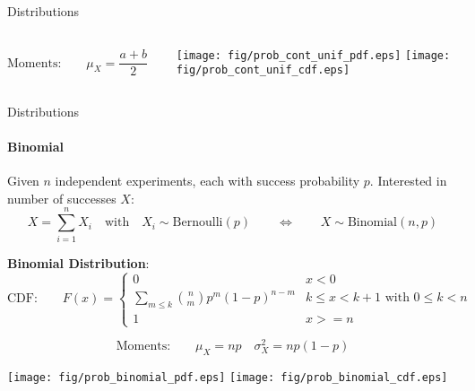 {\begin{frame}{Distributions}
\begin{columns}[onlytextwidth]
\begin{column}{0.5\textwidth}
\begin{boxed}
                    $$\text{Moments:}\qquad \displaystyle \mu_X = \frac{a+b}{2} \quad \sigma_X^2 = \frac{(b-a)^2}{12}$$
                \end{boxed}
            \end{column}
            \begin{column}{0.5\textwidth}
                \begin{center}
                    \texttt{[image: fig/prob\_cont\_unif\_pdf.eps]}
                    \texttt{[image: fig/prob\_cont\_unif\_cdf.eps]}
                \end{center}
            \end{column}
        \end{columns}
    \end{frame}

    \begin{frame}{Distributions}
        \framesubtitle{Binomial}
        Given $n$ independent experiments, each with success probability $p$. Interested in
        number of successes $X$:
        $$X = \sum_{i=1}^n X_i \quad \text{with} \quad X_i \sim \mathrm{Bernoulli}(p)
            \qquad \Longleftrightarrow \qquad X \sim \mathrm{Binomial}(n, p)
        $$

        \vspace*{-2mm}
        \begin{boxed}
            \textbf{Binomial Distribution}:
            $$
                \text{CDF:}\qquad F(x) = \begin{cases}
                    0                                          & x < 0                                   \\
                    \sum_{m \le k} \binom{n}{m} p^m(1-p)^{n-m} & k \le x < k+1 \text{ with } 0 \le k < n \\
                    1                                          & x >= n
                \end{cases}
            $$

            $$\text{Moments:}\qquad \displaystyle \mu_X = np \quad \sigma_X^2 = np(1-p)$$
        \end{boxed}
        \vspace*{-3mm}
        \begin{center}
            \texttt{[image: fig/prob\_binomial\_pdf.eps]}
            \qquad
            \texttt{[image: fig/prob\_binomial\_cdf.eps]}
        \end{center}


\end{frame}}
